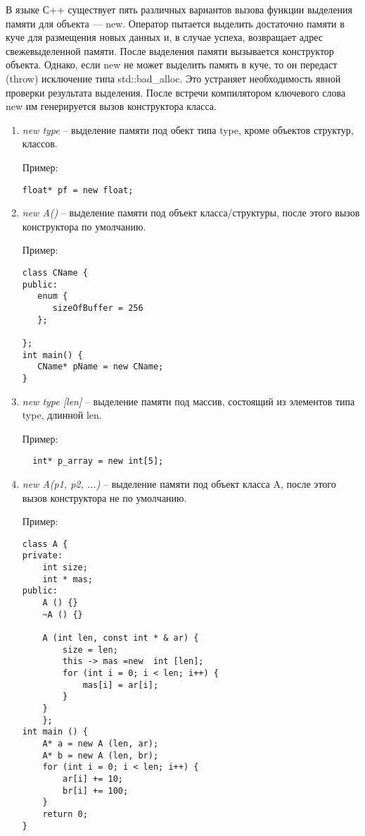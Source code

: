 В языке С++ существует пять различных вариантов вызова функции выделения памяти для объекта --- new. Оператор пытается выделить достаточно памяти в куче для размещения новых данных и, в случае успеха, возвращает адрес свежевыделенной памяти. После выделения памяти вызывается конструктор объекта. Однако, если new не может выделить память в куче, то он передаст (throw) исключение типа std::bad\_alloc. Это устраняет необходимость явной проверки результата выделения. После встречи компилятором ключевого слова new им генерируется вызов конструктора класса.
\begin {enumerate}

\item \textit{new type} -- выделение памяти под обект типа type, кроме объектов структур, классов. 

Пример:
 \begin{lstlisting}
float* pf = new float;
\end{lstlisting}
 
\item \textit{new A()} -- выделение памяти под объект класса/структуры, после этого вызов конструктора по умолчанию. 

Пример:
 \begin{lstlisting}
class CName {
public:
   enum {
      sizeOfBuffer = 256
   };

};
int main() {
   CName* pName = new CName;
}
\end{lstlisting}

\item\textit{ new type [len]} -- выделение памяти под массив, состоящий из элементов типа type, длинной len.

 Пример:
 \begin{lstlisting}
  int* p_array = new int[5];
\end{lstlisting}

\item \textit{new A(p1, p2, ...)} -- выделение памяти под объект класса A, после этого вызов конструктора не по умолчанию. 

Пример:
 \begin{lstlisting}
class A {
private:
	int size;
	int * mas;
public:
	A () {}
	~A () {}

	A (int len, const int * & ar) {
		size = len;
		this -> mas =new  int [len];
		for (int i = 0; i < len; i++) {
			mas[i] = ar[i];
		}
	}
	};
int main () {
	A* a = new A (len, ar);
	A* b = new A (len, br);
	for (int i = 0; i < len; i++) {
		ar[i] += 10;
		br[i] += 100;
	}
	return 0;
}
\end{lstlisting}
\end {enumerate}

